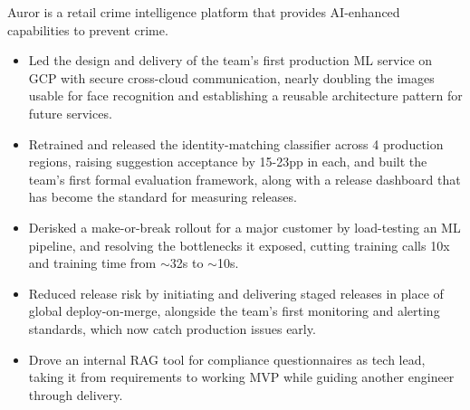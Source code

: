 \documentclass[12pt,a4paper,withhyper]{altacv}
\begin{document}
Auror is a retail crime intelligence platform that provides AI-enhanced capabilities to prevent crime.
\begin{itemize}

    \item Led the design and delivery of the team's first production ML service on GCP with secure cross-cloud communication, nearly doubling the images usable for face recognition and establishing a reusable architecture pattern for future services.

    \item Retrained and released the identity-matching classifier across 4 production regions, raising suggestion acceptance by 15-23pp in each, and built the team's first formal evaluation framework, along with a release dashboard that has become the standard for measuring releases.
    
    \item Derisked a make-or-break rollout for a major customer by load-testing an ML pipeline, and resolving the bottlenecks it exposed, cutting training calls 10x and training time from $\sim$32s to $\sim$10s.
    
    \item Reduced release risk by initiating and delivering staged releases in place of global deploy-on-merge, alongside the team's first monitoring and alerting standards, which now catch production issues early.
    
    \item Drove an internal RAG tool for compliance questionnaires as tech lead, taking it from requirements to working MVP while guiding another engineer through delivery.

\end{itemize}

\divider{}
\end{document}
